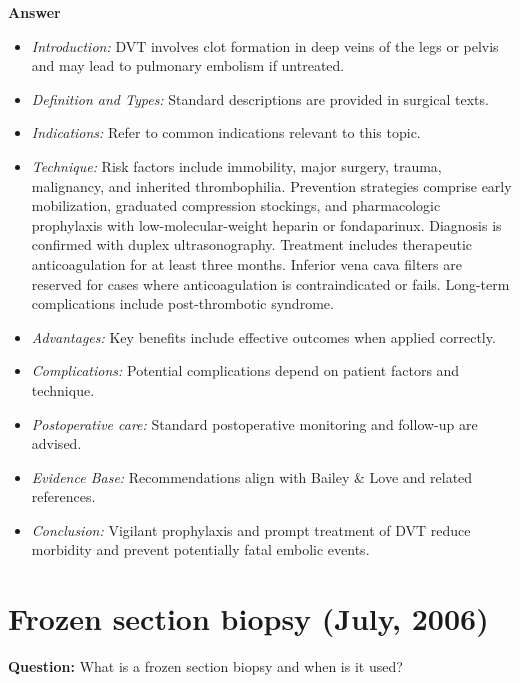 \documentclass{article}
\begin{document}
\textbf{Answer}
\begin{itemize}

\item \emph{Introduction:} DVT involves clot formation in deep veins of the legs or pelvis and may lead to pulmonary embolism if untreated.
\item \emph{Definition and Types:} Standard descriptions are provided in surgical texts.
\item \emph{Indications:} Refer to common indications relevant to this topic.

\item \emph{Technique:} Risk factors include immobility, major surgery, trauma, malignancy, and inherited thrombophilia. Prevention strategies comprise early mobilization, graduated compression stockings, and pharmacologic prophylaxis with low-molecular-weight heparin or fondaparinux. Diagnosis is confirmed with duplex ultrasonography. Treatment includes therapeutic anticoagulation for at least three months. Inferior vena cava filters are reserved for cases where anticoagulation is contraindicated or fails. Long-term complications include post-thrombotic syndrome.
\item \emph{Advantages:} Key benefits include effective outcomes when applied correctly.
\item \emph{Complications:} Potential complications depend on patient factors and technique.
\item \emph{Postoperative care:} Standard postoperative monitoring and follow-up are advised.
\item \emph{Evidence Base:} Recommendations align with Bailey \& Love and related references.

\item \emph{Conclusion:} Vigilant prophylaxis and prompt treatment of DVT reduce morbidity and prevent potentially fatal embolic events.


\end{itemize}

\section{Frozen section biopsy (July, 2006)}

\textbf{Question:} What is a frozen section biopsy and when is it used?
\end{document}
